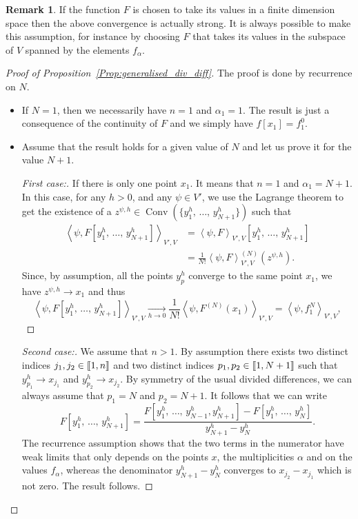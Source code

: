 \documentclass[10pt]{amsart}
\theoremstyle{definition}\newtheorem{defi}[theo]{Definition}\newtheorem{rema}[theo]{Remark}\newtheorem{exam}[theo]{Example}\newtheorem{exem}[theo]{Example}\newtheorem{nota}[theo]{Notation}
\DeclareMathOperator{\Conv}{Conv}
\newenvironment{step}[1]{\begin{proof}[#1]}{\let\qed\relax\end{proof}}
\newcommand{\llbracket}{\mathopen{[\mkern -2.7mu[}}
\newcommand{\rrbracket}{\mathclose{]\mkern -2.7mu]}}
\newcommand{\inter}[2]{\llbracket #1,#2 \rrbracket}
\newcommand{\dualV}[2]{\left\langle #1, #2 \right\rangle_{V',V}}
\begin{document}
\begin{rema}
If the function $F$ is chosen to take its values in a finite dimension space then the above convergence is actually strong. It is always possible to make this assumption, for instance by choosing $F$ that takes its values in the subspace of $V$ spanned by the elements $f_\alpha$.
\end{rema}

\begin{proof}[Proof of Proposition~\ref{Prop:generalised_div_diff}]
The proof is done by recurrence on $N$.
\begin{itemize}
\item If $N=1$, then we necessarily have $n=1$ and $\alpha_1=1$. The result is just a consequence of the continuity of $F$ and we simply have $f[x_1]=f_1^0$.

\item Assume that the result holds for a given value of $N$ and let us prove it for the value $N+1$.
\begin{step}{First case:}
If there is only one point $x_1$. It means that $n=1$ and $\alpha_1=N+1$. In this case, for any $h>0$, and any $\psi\in V'$, we use the Lagrange theorem to get the existence of a $z^{\psi,h}\in \Conv(\{y_1^h,\,\dotsc,\,y_{N+1}^h\})$ such that
\begin{align*}
\dualV{\psi}{F[y_1^h,\,\dotsc,\,y_{N+1}^h]} & = \dualV{\psi}{F}[y_1^h,\,\dotsc,\,y_{N+1}^h]
\\
& = \frac{1}{N!} \dualV{\psi}{F}^{(N)}(z^{\psi,h}).
\end{align*}
Since, by assumption, all the points $y_p^h$ converge to the same point $x_1$, we have $z^{\psi,h}\to x_1$ and thus
\[
\dualV{\psi}{F[y_1^h,\,\dotsc,\,y_{N+1}^h]} \xrightarrow[h\to 0]{} \frac{1}{N!} \dualV{\psi}{F^{(N)}(x_1)} = \dualV{\psi}{f_1^N},
\]
\end{step}
\begin{step}{Second case:}
We assume that $n>1$. By assumption there exists two distinct indices $j_1, j_2\in \inter{1}{n}$ and two distinct indices $p_1,p_2\in \inter{1}{N+1}$ such that $y_{p_1}^h \to x_{j_1}$ and $y_{p_2}^h\to x_{j_2}$. By symmetry of the usual divided differences, we can always assume that $p_1=N$ and $p_2=N+1$. It follows that we can write
\[
F\left[y_1^h,\,\dotsc,\,y_{N+1}^h\right] = \frac{ F\left[y_1^h,\,\dotsc,\,y_{N-1}^h,y_{N+1}^h\right] - F\left[y_1^h,\,\dotsc,\,y_{N}^h\right]}{y_{N+1}^h - y_N^h}.
\]
The recurrence assumption shows that the two terms in the numerator have weak limits that only depends on the points $x$, the multiplicities $\alpha$ and on the values $f_\alpha$, whereas the denominator $y_{N+1}^h - y_N^h$ converges to $x_{j_2}-x_{j_1}$ which is not zero. The result follows.
\end{step}
\end{itemize}
\end{proof}
\end{document}
